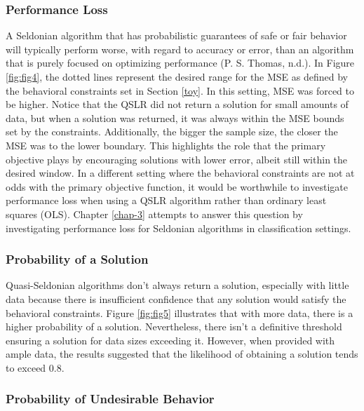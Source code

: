 \documentclass[12pt, twoside]{amherstthesis}
\begin{document}
\hypertarget{performance-loss}{%
\subsubsection{Performance Loss}\label{performance-loss}}

A Seldonian algorithm that has probabilistic guarantees of safe or fair behavior will typically perform worse, with regard to accuracy or error, than an algorithm that is purely focused on optimizing performance (P. S. Thomas, n.d.). In Figure \ref{fig:fig4}, the dotted lines represent the desired range for the MSE as defined by the behavioral constraints set in Section \ref{toy}. In this setting, MSE was forced to be higher. Notice that the QSLR did not return a solution for small amounts of data, but when a solution was returned, it was always within the MSE bounds set by the constraints. Additionally, the bigger the sample size, the closer the MSE was to the lower boundary. This highlights the role that the primary objective plays by encouraging solutions with lower error, albeit still within the desired window. In a different setting where the behavioral constraints are not at odds with the primary objective function, it would be worthwhile to investigate performance loss when using a QSLR algorithm rather than ordinary least squares (OLS). Chapter \ref{chap-3} attempts to answer this question by investigating performance loss for Seldonian algorithms in classification settings.

\hypertarget{probability-of-a-solution}{%
\subsubsection{Probability of a Solution}\label{probability-of-a-solution}}

Quasi-Seldonian algorithms don't always return a solution, especially with little data because there is insufficient confidence that any solution would satisfy the behavioral constraints. Figure \ref{fig:fig5} illustrates that with more data, there is a higher probability of a solution. Nevertheless, there isn't a definitive threshold ensuring a solution for data sizes exceeding it. However, when provided with ample data, the results suggested that the likelihood of obtaining a solution tends to exceed 0.8.

\hypertarget{probability-of-undesirable-behavior}{%
\subsubsection{Probability of Undesirable Behavior}\label{probability-of-undesirable-behavior}}
\end{document}
